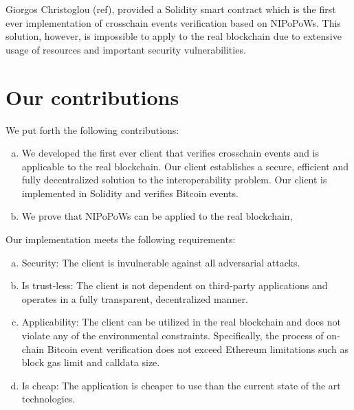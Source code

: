 Giorgos Christoglou (ref), provided a Solidity smart contract which is the
first ever implementation of crosschain events verification based on NIPoPoWs.
This solution, however, is impossible to apply to the real blockchain due to
extensive usage of resources and important security vulnerabilities.

\section{Our contributions}


We put forth the following contributions:

\begin{enumerate}[(a)]

    \item We developed the first ever client that verifies crosschain events
        and is applicable to the real blockchain. Our client establishes a
        secure, efficient and fully decentralized solution to the
        interoperability problem. Our client is implemented in Solidity and
        verifies Bitcoin events.

    \item We prove that NIPoPoWs can be applied to the real blockchain,

\end{enumerate}

\bigbreak
Our implementation meets the following requirements:
\begin{enumerate}[(a)]

    \item
        Security: The client is invulnerable against all adversarial attacks.

    \item Is trust-less: The client is not dependent on third-party
        applications and operates in a fully transparent, decentralized manner.

    \item Applicability: The client can be utilized in the real blockchain and
        does not violate any of the environmental constraints. Specifically,
        the process of on-chain Bitcoin event verification does not exceed
        Ethereum limitations such as block gas limit and calldata size.

    \item Is cheap: The application is cheaper to use than the current state of
        the art technologies.

\end{enumerate}

